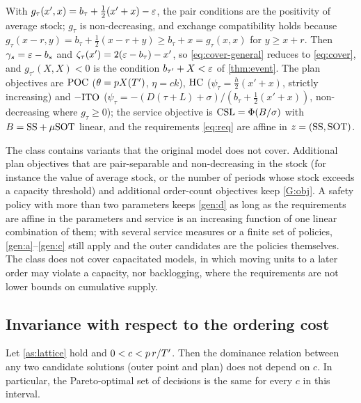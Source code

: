 \begin{remark}
  With $g_\tau(x',x)=b_\tau+\tfrac12(x'+x)-\varepsilon$, the pair conditions are the positivity of
  average stock; $g_\tau$ is non-decreasing, and exchange compatibility holds because
  $g_\tau(x-r,y)=b_\tau+\tfrac12(x-r+y)\ge b_\tau+x=g_\tau(x,x)$ for $y\ge x+r$. Then
  $\gamma_s=\varepsilon-b_s$ and $\zeta_\tau(x')=2(\varepsilon-b_\tau)-x'$, so \eqref{eq:cover-general}
  reduces to \eqref{eq:cover}, and $g_{\tau'}(X,X)<0$ is the condition $b_{\tau'}+X<\varepsilon$ of
  \cref{thm:event}. The plan objectives are $\mathrm{POC}$ ($\theta=pX(T')$, $\eta=ck$), $\mathrm{HC}$
  ($\psi_\tau=\tfrac h2(x'+x)$, strictly increasing) and $-\mathrm{ITO}$
  ($\psi_\tau=-(D(\tau+L)+\sigma)/(b_\tau+\tfrac12(x'+x))$, non-decreasing where $g_\tau\ge0$);
  the service objective is $\mathrm{CSL}=\Phi(B/\sigma)$ with $B=\mathrm{SS}+\mu\mathrm{SOT}$ linear, and the
  requirements \eqref{eq:req} are affine in $z=(\mathrm{SS},\mathrm{SOT})$.
\end{remark}

\begin{remark}
  The class contains variants that the original model does not cover. Additional plan
  objectives that are pair-separable and non-decreasing in the stock (for instance the value
  of average stock, or the number of periods whose stock exceeds a capacity threshold) and
  additional order-count objectives keep \ref{G:obj}. A safety policy with more than two
  parameters keeps \ref{gen:d} as long as the requirements are affine in the parameters and
  service is an increasing function of one linear combination of them; with several
  service measures or a finite set of policies, \ref{gen:a}--\ref{gen:c} still apply and the
  outer candidates are the policies themselves. The class does not cover capacitated
  models, in which moving units to a later order may violate a capacity, nor backlogging,
  where the requirements are not lower bounds on cumulative supply.
\end{remark}

\subsection{Invariance with respect to the ordering cost}\label{app:invariance}

\begin{proposition}\label{prop:c}
  Let \cref{as:lattice} hold and $0<c<p\,r/T'$. Then the dominance relation between any
  two candidate solutions (outer point and plan) does not depend on $c$. In particular,
  the Pareto-optimal set of decisions is the same for every $c$ in this interval.
\end{proposition}

